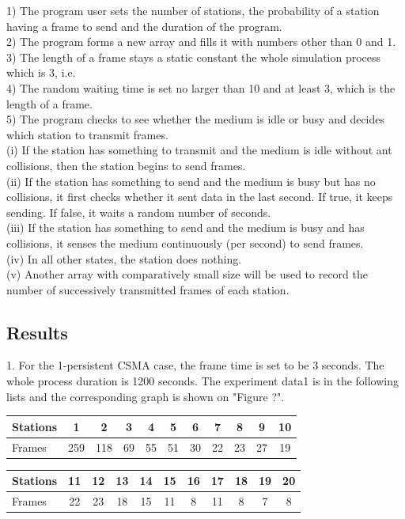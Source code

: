 \documentclass[11pt,a4paper]{report}
\begin{document}
1) The program user sets the number of stations, the probability of a station having a frame to send and the duration of the program. \\
2) The program forms a new array and fills it with numbers other than 0 and 1. \\
3) The length of a frame stays a static constant the whole simulation process which is 3, i.e. \\
4) The random waiting time is set no larger than 10 and at least 3, which is the length of a frame. \\
5) The program checks to see whether the medium is idle or busy and decides which station to transmit frames. \\
(i) If the station has something to transmit and the medium is idle without ant collisions, then the station begins to send frames. \\
(ii) If the station has something to send and the medium is busy but has no collisions, it first checks whether it sent data in the last second. If true, it keeps sending. If false, it waits a random number of seconds. \\
(iii) If the station has something to send and the medium is busy and has collisions, it senses the medium continuously (per second) to send frames. \\
(iv) In all other states, the station does nothing. \\
(v) Another array with comparatively small size will be used to record the number of successively transmitted frames of each station.

\subsection*{Results}
1. For the 1-persistent CSMA case, the frame time is set to be 3 seconds. The whole process duration is 1200 seconds. The experiment data1 is in the following lists and the corresponding graph is shown on "Figure ?".

\begin{table}[htbp]
\begin{tabular}{lcccccccccc}
\toprule
Stations & 1 & 2 & 3 & 4 & 5 & 6 & 7 & 8 & 9 & 10 \\
\midrule
Frames & 259 & 118 & 69 & 55 & 51 & 30 & 22 & 23 & 27 & 19 \\
\bottomrule
\end{tabular}
\end{table}

\begin{table}[htbp]
\begin{tabular}{lcccccccccc}
\toprule
Stations & 11 & 12 & 13  & 14 & 15 & 16 & 17 & 18 & 19 & 20 \\
\midrule
Frames & 22 & 23 & 18 & 15 & 11 & 8 & 11 & 8 & 7 & 8 \\
\bottomrule
\end{tabular}
\end{table}
\end{document}
